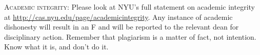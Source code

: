 \begin{description}
  \item \textsc{Academic integrity:} Please look at NYU’s full statement on
    academic integrity at \url{http://cas.nyu.edu/page/academicintegrity}.
    Any instance of academic dishonesty will result in an F and will be
    reported to the relevant dean for disciplinary action. Remember that
    plagiarism is a matter of fact, not intention. Know what it is, and don’t
    do it.

\end{description}
